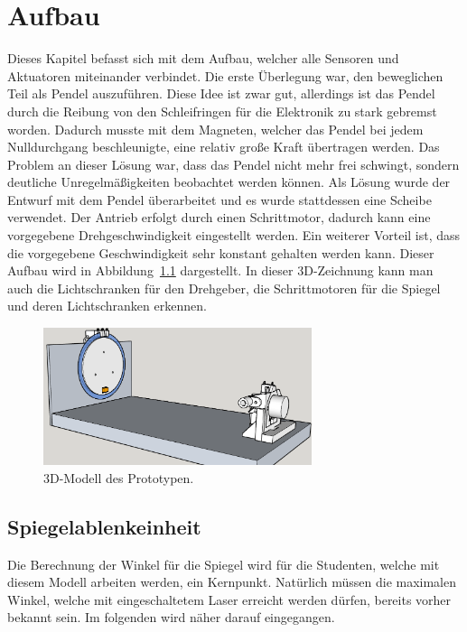 \chapter{Aufbau}
\label{chap:aufbau}

Dieses Kapitel befasst sich mit dem Aufbau, welcher alle Sensoren und Aktuatoren miteinander verbindet.
Die erste Überlegung war, den beweglichen Teil als Pendel auszuführen.
Diese Idee ist zwar gut, allerdings ist das Pendel durch die Reibung von den Schleifringen für die Elektronik zu stark gebremst worden.
Dadurch musste mit dem Magneten, welcher das Pendel bei jedem Nulldurchgang beschleunigte, eine relativ große Kraft übertragen werden.
Das Problem an dieser Lösung war, dass das Pendel nicht mehr frei schwingt, sondern deutliche Unregelmäßigkeiten beobachtet werden können.
Als Lösung wurde der Entwurf mit dem Pendel überarbeitet und es wurde stattdessen eine Scheibe verwendet.
Der Antrieb erfolgt durch einen Schrittmotor, dadurch kann eine vorgegebene Drehgeschwindigkeit eingestellt werden.
Ein weiterer Vorteil ist, dass die vorgegebene Geschwindigkeit sehr konstant gehalten werden kann.
Dieser Aufbau wird in Abbildung~\ref{fig:3dSchreibe} dargestellt.
In dieser 3D-Zeichnung kann man auch die Lichtschranken für den Drehgeber, die Schrittmotoren für die Spiegel und deren Lichtschranken erkennen.

\begin{figure}[!h] \centering
\includegraphics[width=0.7\textwidth]{img/Sketchup/Disc00.PNG}
\caption{3D-Modell des Prototypen.}
\label{fig:3dSchreibe}
\end{figure}


\section{Spiegelablenkeinheit}
Die Berechnung der Winkel für die Spiegel wird für die Studenten, welche mit diesem Modell arbeiten werden, ein Kernpunkt.
Natürlich müssen die maximalen Winkel, welche mit eingeschaltetem Laser erreicht werden dürfen, bereits vorher bekannt sein.
Im folgenden wird näher darauf eingegangen.

